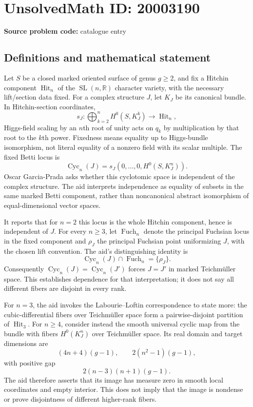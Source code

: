 \documentclass[11pt]{article}
\newcommand{\R}{\mathbb{R}}
\begin{document}
\section*{UnsolvedMath ID: 20003190}
\textbf{Source problem code:} catalogue entry
\subsection{Definitions and mathematical statement}
Let $S$ be a closed marked oriented surface of genus $g\geq2$, and fix a Hitchin component $\operatorname{Hit}_n$ of the $\operatorname{SL}(n,\R)$ character variety, with the necessary lift/section data fixed. For a complex structure $J$, let $K_J$ be its canonical bundle. In Hitchin-section coordinates,
\[
s_J:\bigoplus_{k=2}^nH^0(S,K_J^k)\longrightarrow\operatorname{Hit}_n,
\]
Higgs-field scaling by an $n$th root of unity acts on $q_k$ by multiplication by that root to the $k$th power. Fixedness means equality up to Higgs-bundle isomorphism, not literal equality of a nonzero field with its scalar multiple. The fixed Betti locus is
\[
\operatorname{Cyc}_n(J)=s_J(0,\ldots,0,H^0(S,K_J^n)).
\]
Oscar Garcia-Prada asks whether this cyclotomic space is independent of the complex structure. The aid interprets independence as equality of subsets in the same marked Betti component, rather than noncanonical abstract isomorphism of equal-dimensional vector spaces.

It reports that for $n=2$ this locus is the whole Hitchin component, hence is independent of $J$. For every $n\geq3$, let $\operatorname{Fuch}_n$ denote the principal Fuchsian locus in the fixed component and $\rho_J$ the principal Fuchsian point uniformizing $J$, with the chosen lift convention. The aid's distinguishing identity is
\[
\operatorname{Cyc}_n(J)\cap\operatorname{Fuch}_n=\{\rho_J\}.
\]
Consequently $\operatorname{Cyc}_n(J)=\operatorname{Cyc}_n(J')$ forces $J=J'$ in marked Teichm\"uller space. This establishes dependence for that interpretation; it does not say all different fibers are disjoint in every rank.

For $n=3$, the aid invokes the Labourie--Loftin correspondence to state more: the cubic-differential fibers over Teichm\"uller space form a pairwise-disjoint partition of $\operatorname{Hit}_3$. For $n\geq4$, consider instead the smooth universal cyclic map from the bundle with fibers $H^0(K_J^n)$ over Teichm\"uller space. Its real domain and target dimensions are
\[
(4n+4)(g-1),\qquad2(n^2-1)(g-1),
\]
with positive gap
\[
2(n-3)(n+1)(g-1).
\]
The aid therefore asserts that its image has measure zero in smooth local coordinates and empty interior. This does not imply that the image is nondense or prove disjointness of different higher-rank fibers.
\end{document}
